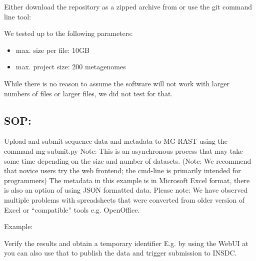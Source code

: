\documentclass[letterpaper,10pt,english]{sphinxmanual}
\begin{document}
Either download the repository as a zipped archive from
 or use the
git command line tool:

\begin{sphinxVerbatim}[commandchars=\\\{\}]
  
\end{sphinxVerbatim}

We tested up to the following parameters:
\begin{itemize}
\item {} 
max. size per file: 10GB

\item {} 
max. project size: 200 metagenomes

\end{itemize}

While there is no reason to assume the software will not work with
larger numbers of files or larger files, we did not test for that.


\subsection{SOP:}
\label{\detokenize{api:sop}}
Upload and submit sequence data and metadata to MG-RAST using the
command mg-submit.py Note: This is an asynchronous process that may take
some time depending on the size and number of datasets. (Note: We
recommend that novice users try the web frontend; the cmd-line is
primarily intended for programmers) The metadata in this example is in
Microsoft Excel format, there is also an option of using JSON formatted
data. Please note: We have observed multiple problems with spreadsheets
that were converted from older version of Excel or “compatible” tools
e.g. OpenOffice.

Example:

\begin{sphinxVerbatim}[commandchars=\\\{\}]
      
\end{sphinxVerbatim}

Verify the results and obtain a temporary identifier E.g. by using the
WebUI at  \textendash{} you can also use that to publish the data
and trigger submission to INSDC.
\end{document}
